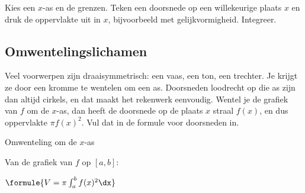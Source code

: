 \begin{werkwijze}
Kies een $x$-as en de grenzen. Teken een doorsnede op een willekeurige plaats $x$ en druk de oppervlakte uit in $x$, bijvoorbeeld met gelijkvormigheid. Integreer.
\end{werkwijze}


\begin{oefeningen}
\end{oefeningen}

\subsection{Omwentelingslichamen}

Veel voorwerpen zijn draaisymmetrisch: een vaas, een ton, een trechter. Je krijgt ze door een kromme te wentelen om een as. Doorsneden loodrecht op die as zijn dan altijd cirkels, en dat maakt het rekenwerk eenvoudig. Wentel je de grafiek van $f$ om de $x$-as, dan heeft de doorsnede op de plaats $x$ straal $f(x)$, en dus oppervlakte $\pi f(x)^2$. Vul dat in de formule voor doorsneden in.

\begin{theorie}
\begin{stelling}{Omwenteling om de $x$-as}
\begin{minipage}[t]{.60\linewidth}
\vspace{0pt}
Van de grafiek van $f$ op $[a, b]$:

\vspace{1mm}
\qquad $\formule{V = \pi \int_a^b f(x)^2\dx}$
\end{minipage}\hfill
\begin{minipage}[t]{.36\linewidth}
\vspace{0pt}
\end{minipage}
\end{stelling}
\end{theorie}

